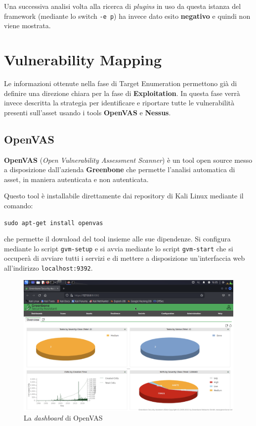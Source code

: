 \documentclass[a4paper, 12pt, oneside]{article}
\begin{document}
Una successiva analisi volta alla ricerca di \textit{plugins} in uso da questa istanza del framework (mediante lo switch \texttt{-e p}) ha invece dato esito \textbf{negativo} e quindi non viene mostrata.

\newpage
\section{Vulnerability Mapping}
Le informazioni ottenute nella fase di Target Enumeration permettono già di definire una direzione chiara per la fase di \textbf{Exploitation}. In questa fase verrà invece descritta la strategia per identificare e riportare tutte le vulnerabilità presenti sull'asset usando i tools \textbf{OpenVAS} e \textbf{Nessus}.

\subsection{OpenVAS}
\textbf{OpenVAS} (\textit{Open Vulnerability Assessment Scanner}) è un tool open source messo a disposizione dall'azienda \textbf{Greenbone} che permette l'analisi automatica di asset, in maniera autenticata e non autenticata.\cite{openvas}

Questo tool è installabile direttamente dai repository di Kali Linux mediante il comando:

\begin{center}
    \texttt{sudo apt-get install openvas}
\end{center}

che permette il download del tool insieme alle sue dipendenze. Si configura mediante lo script \texttt{gvm-setup} e si avvia mediante lo script \texttt{gvm-start} che si occuperà di avviare tutti i servizi e di mettere a disposizione un'interfaccia web all'indirizzo \texttt{localhost:9392}.

\begin{figure}[h!]
    \centering
    \includegraphics[width=0.8 \textwidth]{img/openvas-dashboard.png}
    \caption{La \textit{dashboard} di OpenVAS}
\end{figure}
\end{document}
